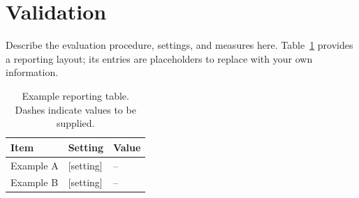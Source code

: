 \section{Validation}
\label{sec:validation}

Describe the evaluation procedure, settings, and measures here. Table~\ref{tab:example} provides a reporting layout; its entries are placeholders to replace with your own information.

\begin{table}[htbp]
  \centering
  \caption{Example reporting table. Dashes indicate values to be supplied.}
  \label{tab:example}
  \begin{tabular}{lll}
    \toprule
    Item & Setting & Value \\
    \midrule
    Example A & [setting] & -- \\
    Example B & [setting] & -- \\
    \bottomrule
  \end{tabular}
\end{table}
